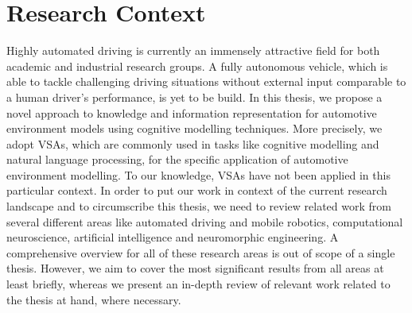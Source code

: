 \chapter{Research Context}
Highly automated driving is currently an immensely attractive field for both academic and industrial research groups. 
A fully autonomous vehicle, which is able to tackle challenging driving situations without external input comparable to a human driver's performance, is yet to be build.
In this thesis, we propose a novel approach to knowledge and information representation for automotive environment models using cognitive modelling techniques.
More precisely, we adopt \acfp{VSA}, which are commonly used in tasks like cognitive modelling and natural language processing, for the specific application of automotive environment modelling.
To our knowledge, \acp{VSA} have not been applied in this particular context. 
In order to put our work in context of the current research landscape and to circumscribe this thesis, we need to review related work from several different areas like automated driving and mobile robotics, computational neuroscience, artificial intelligence and neuromorphic engineering.
A comprehensive overview for all of these research areas is out of scope of a single thesis.
However, we aim to cover the most significant results from all areas at least briefly, whereas we present an in-depth review of relevant work related to the thesis at hand, where necessary.

